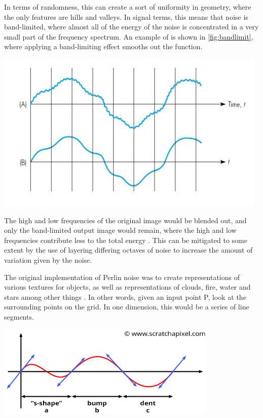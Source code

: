 \documentclass[10pt]{report}
\begin{document}
		In terms of randomness, this can create a sort of uniformity in geometry, where the only features are hills and valleys. In signal terms, this means that noise is band-limited, where almost all of the energy of the noise is concentrated in a very small part of the frequency spectrum. An example of is shown in \autoref{fig:bandlimit}, where applying a band-limiting effect smooths out the function.
		
		\begin{minipage}{\textwidth}
			\centering
			\includegraphics[scale=.5]{bandlimiting-filter}
			\label{fig:bandlimit}
		\end{minipage}
		
		The high and low frequencies of the original image would be blended out, and only the band-limited output image would remain, where the high and low frequencies contribute less to the total energy \cite{making-noise}. This can be mitigated to some extent by the use of layering differing octaves of noise to increase the amount of variation given by the noise. 
		
		The original implementation of Perlin noise was to create representations of various textures for objects, as well as representations of clouds, fire, water and stars among other things \cite{10.1145/325165.325247}. In other words, given an input point P, look at the surrounding points on the grid. In one dimension, this would be a series of line segments. 
		
		\begin{minipage}{\textwidth}
			\centering
			\includegraphics[scale=.5]{noise-value-vs-perlin3}
			\label{fig:pnoise1d}
		\end{minipage} 
		
\end{document}
